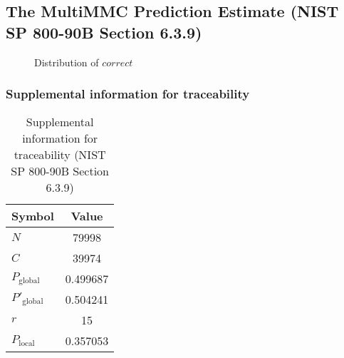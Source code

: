 \documentclass[a3paper,xelatex,english]{bxjsarticle}
\begin{document}
\subsection{The MultiMMC Prediction Estimate (NIST SP 800-90B Section 6.3.9)}
\begin{figure}[htbp]
\centering

\caption{Distribution of $correct$}
\end{figure}
\subsubsection{Supplemental information for traceability}
\renewcommand{\arraystretch}{1.8}
\begin{table}[h]
\caption{Supplemental information for traceability (NIST SP 800-90B Section 6.3.9)}
\begin{center}
\begin{tabular}{|l|c|}
\hline 
\rowcolor{anotherlightblue} %
Symbol				& Value \\ \hline 
$N$				& 79998\\ \hline 
$C$				& 39974\\ \hline 
$P_{\textrm{global}}$				& 0.499687\\ \hline 
$P'_{\textrm{global}}$			& 0.504241\\ \hline 
$r$				& 15\\ \hline 
$P_{\textrm{local}}$ 			& 0.357053\\ \hline
\end{tabular}
\end{center}
\end{table}
\renewcommand{\arraystretch}{1.4}
\clearpage
\end{document}
